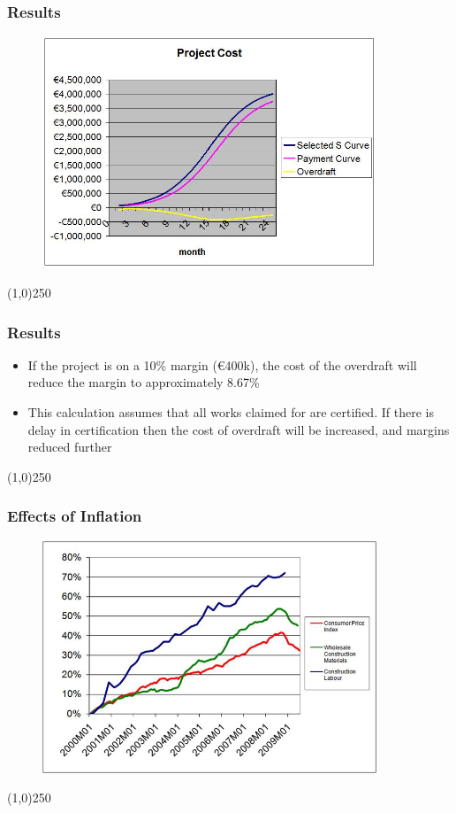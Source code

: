 \begin{frame}
\frametitle{Results}
		\begin{figure}
			\centering
				\includegraphics[width = 10cm]{images/prjcostcurve.jpg}
			\label{fig:lgprjcostcurve}
		\end{figure}
\end{frame}
\begin{center}\line(1,0){250}\end{center}






\begin{frame}
\frametitle{Results}
\begin{itemize}
	\item If the project is on a 10\% margin (\euro400k), the cost of the overdraft will reduce the margin to approximately 8.67\%
	\item This calculation assumes that all works claimed for are certified.  If there is delay in certification then the cost of overdraft will be increased, and margins reduced further
\end{itemize}
\end{frame}
\begin{center}\line(1,0){250}\end{center}






\begin{frame}
\frametitle{Effects of Inflation}
\begin{figure}
	\centering
		\includegraphics[width = 10cm]{images/deflation.jpg}
	\label{fig:inflation}
\end{figure}
\end{frame}
\begin{center}\line(1,0){250}\end{center}






